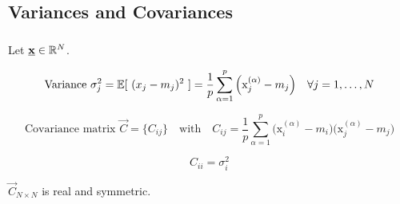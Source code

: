 \subsection{Variances and Covariances}


\begin{frame}\frametitle{\subsecname}

Let $\underline{\mathbf{x}} \in \mathbb{R}^N$.

\begin{equation}
\text{Variance}~\sigma_j^2 = \mathbb{E}\lbrack~(x_j - m_j)^2~\rbrack = \frac{1}{p} \sum\limits_{\alpha = 1}^p 
		 \Big( \mathrm{x}_j^{(\alpha)} - m_j \Big) \quad \forall j=1,\ldots,N
\end{equation}

\pause

\begin{equation}
	\text{Covariance matrix } \vec{C} = \big\{ C_{ij} \big\} \quad \text{with} \quad
	C_{ij} = \frac{1}{p} \sum\limits_{\alpha = 1}^p 
		 \Big( \mathrm{x}_i^{(\alpha)} - m_i \Big) 
		 \Big( \mathrm{x}_j^{(\alpha)} - m_j \Big)
\end{equation}


\begin{equation}
C_{ii} = \sigma^2_i
\end{equation}

$\vec{C}_{N \times N}$ is real and symmetric.

		
\end{frame}


